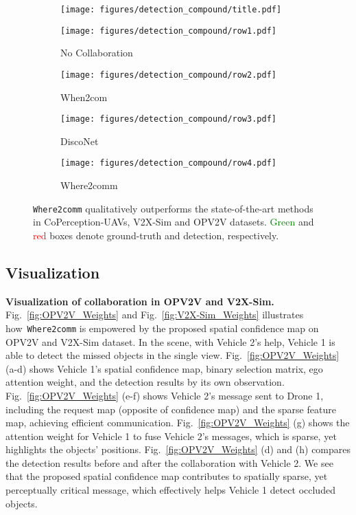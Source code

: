 \documentclass{article}
\begin{document}
\begin{figure}
\centering
  \begin{subfigure}{0.05\linewidth}
    \texttt{[image: figures/detection\_compound/title.pdf]}
  \end{subfigure}
  \hspace{-3mm}
  \begin{subfigure}{0.23\linewidth}
    \texttt{[image: figures/detection\_compound/row1.pdf]}
    \caption{No Collaboration}
    \label{fig:opv2v_cam_result_no_comm}
  \end{subfigure}
\begin{subfigure}{0.23\linewidth}
    \texttt{[image: figures/detection\_compound/row2.pdf]}
    \caption{When2com}
    \label{fig:opv2v_cam_result_disconet}
  \end{subfigure}
  \begin{subfigure}{0.23\linewidth}
    \texttt{[image: figures/detection\_compound/row3.pdf]}
    \caption{DiscoNet}
    \label{fig:opv2v_cam_result_v2vnet}
  \end{subfigure}
\begin{subfigure}{0.23\linewidth}    \texttt{[image: figures/detection\_compound/row4.pdf]}
    \caption{Where2comm}
    \label{fig:opv2v_cam_result_where2comm}
  \end{subfigure}
  
\vspace{-2mm}
  \caption{\texttt{Where2comm} qualitatively outperforms the state-of-the-art methods in CoPerception-UAVs, V2X-Sim and OPV2V datasets. \textcolor{green}{Green} and \textcolor{red}{red} boxes denote ground-truth and detection, respectively.}
  \label{fig:detections}
  \vspace{-5mm}
\end{figure}

\subsection{Visualization}
\textbf{Visualization of collaboration in OPV2V and V2X-Sim.} Fig.~\ref{fig:OPV2V_Weights} and Fig.~\ref{fig:V2X-Sim_Weights} illustrates how~\texttt{Where2comm} is empowered by the proposed spatial confidence map on OPV2V and V2X-Sim dataset. In the scene, with Vehicle 2's help, Vehicle 1 is able to detect the missed objects in the single view. Fig.~\ref{fig:OPV2V_Weights} (a-d) shows Vehicle 1's spatial confidence map, binary selection matrix, ego attention weight, and the detection results by its own observation. Fig.~\ref{fig:OPV2V_Weights} (e-f) shows Vehicle 2's message sent to Drone 1, including the request map (opposite of confidence map) and the sparse feature map, achieving efficient communication. Fig.~\ref{fig:OPV2V_Weights} (g) shows the attention weight for Vehicle 1 to fuse Vehicle 2's messages, which is sparse, yet highlights the objects' positions. Fig.~\ref{fig:OPV2V_Weights} (d) and (h) compares the detection results before and after the collaboration with Vehicle 2. We see that the proposed spatial confidence map contributes to spatially sparse, yet perceptually critical message, which effectively helps Vehicle 1 detect occluded objects.
\end{document}
